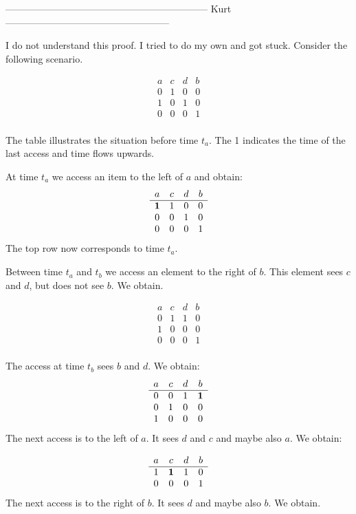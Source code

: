 ---------------------------------------------------------------   Kurt ---------------------------------------------------

I do not understand this proof. I tried to do my own and got stuck. Consider the following scenario.

\[ \begin{array}{cccc}
a & c & d & b \\ \hline
0 & 1 & 0 & 0 \\
1 & 0 & 1 & 0 \\
0 & 0 & 0 & 1 \\
\end{array}\]

The table illustrates the situation before time $t_a$. The 1 indicates the time of the last access and time flows upwards. 

At time $t_a$ we access an item to the left of $a$ and obtain: 
\[ \begin{array}{cccc}
a & c & d & b \\ \hline
{\bf 1}& 1 & 0 & 0 \\
0 & 0 & 1 & 0 \\
0 & 0 & 0 & 1 \\
\end{array}\]
The top row now corresponds to time $t_a$. 

Between time $t_a$ and $t_b$ we access an element to the right of $b$. This element sees $c$ and $d$, but does not see $b$. We obtain. 

\[ \begin{array}{cccc}
a & c & d & b \\ \hline
0 & 1 & 1& 0 \\
1 & 0 & 0 & 0 \\
0 & 0 & 0 & 1 \\
\end{array}\]

The access at time $t_b$ sees $b$ and $d$. We obtain:
\[ \begin{array}{cccc}
a & c & d & b \\ \hline
0 & 0 & 1 & {\bf 1} \\
0 & 1 & 0 & 0 \\
1 & 0 & 0 & 0 \\
\end{array}\]
The next access is to the left of $a$. It sees $d$ and $c$ and maybe also $a$. We obtain:

\[ \begin{array}{cccc}
a & c & d & b \\ \hline
1 & {\bf 1} & 1 & 0 \\
0 & 0 & 0 & 1 \\  \end{array} \]
The next access is to the right of $b$. It sees $d$ and maybe also $b$. We obtain.

